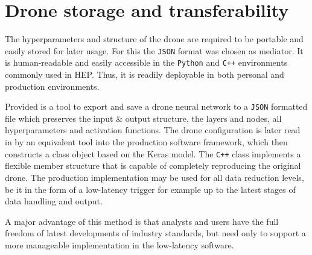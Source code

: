 \section{Drone storage and transferability}
\label{sec:storage}

The hyperparameters and structure of the drone are required to be 
portable and easily stored for later usage. For this the {\tt JSON} format was chosen as 
mediator. It is human-readable and easily accessible in the {\tt Python} and {\tt C++}
environments commonly used in HEP. Thus, it is readily deployable in both personal and production environments.

Provided is a tool to export and save a drone neural network to a {\tt JSON} 
formatted file which preserves the input \& output structure, 
the layers and nodes, all hyperparameters and activation functions. 
The drone configuration is later read in by an equivalent tool into the production software framework,
which then constructs a class object based on the Keras model. The {\tt C++} class implements 
a flexible member structure that is capable of completely reproducing the original drone. The production
implementation may be used for all data reduction levels, be it in the form of a low-latency trigger
for example up to the latest stages of data handling and output. 

A major advantage of this method is that analysts and users have the full freedom of latest developments
of industry standards, but need only to support a more manageable implementation in the low-latency
software.
